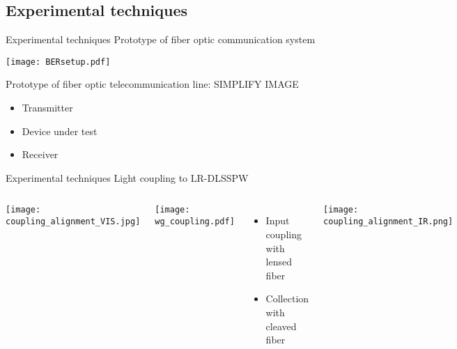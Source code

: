   \subsection{Experimental techniques} %
  \label{sub:experimental_techniques}
  
  \begin{frame}{Experimental techniques}
               {Prototype of fiber optic communication system}
    \begin{center}
      \texttt{[image: BERsetup.pdf]}
    \end{center}
    Prototype of fiber optic telecommunication line: \alert{SIMPLIFY IMAGE}
    \begin{itemize}
      \item Transmitter
      \item Device under test
      \item Receiver
    \end{itemize}
  \end{frame}

  \begin{frame}{Experimental techniques}
               {Light coupling to LR-DLSSPW}
    \begin{columns}
        \texttt{[image: coupling\_alignment\_VIS.jpg]}
        \begin{center}
          \texttt{[image: wg\_coupling.pdf]}          
        \end{center}
        \vspace{-2mm}
        \begin{itemize}
          \item Input coupling with lensed fiber
          \item Collection with cleaved fiber
        \end{itemize}
        \vspace{4mm}
        \texttt{[image: coupling\_alignment\_IR.png]}
    \end{columns}
  \end{frame}


